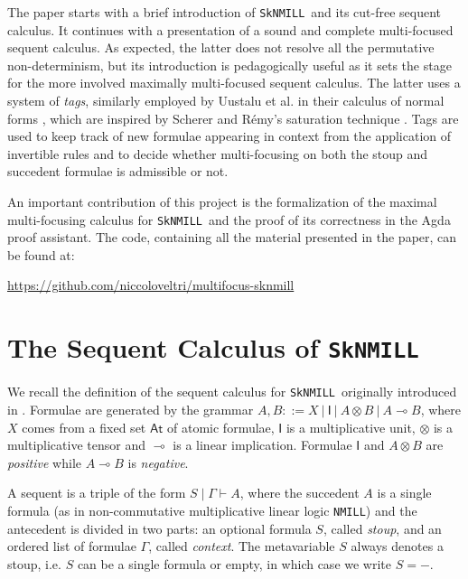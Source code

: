 \documentclass[runningheads]{llncs}
\newcommand{\ot}{\otimes}
\newcommand{\lolli}{\multimap}
\newcommand{\I}{\mathsf{I}}
\newcommand{\NMILL}{\texttt{NMILL}}
\newcommand{\SkNMILL}{\texttt{SkNMILL}}
\newcommand{\At}{\mathsf{At}}
\begin{document}
The paper starts with a brief introduction of \SkNMILL\ and its cut-free sequent calculus. It continues with a presentation of a sound and complete multi-focused sequent calculus. As expected, the latter does not resolve all the permutative non-determinism, but its introduction is pedagogically useful as it sets the stage for the more involved maximally multi-focused sequent calculus. The latter uses a system of \emph{tags}, similarly employed by Uustalu et al. in their calculus of normal forms \cite{UVW:protsn}, which are inspired by Scherer and R{\'e}my's saturation technique \cite{scherer:simple:2015}.
Tags are used to keep track of new formulae appearing in context from the application of invertible rules and to decide whether multi-focusing on both the stoup and succedent formulae is admissible or not.

An important contribution of this project is the formalization of the maximal multi-focusing calculus for \SkNMILL\ and the proof of its correctness in the Agda proof assistant. The code, containing all the material presented in the paper, can be found at:
\begin{center}
  \url{https://github.com/niccoloveltri/multifocus-sknmill}
\end{center}


\section{The Sequent Calculus of \SkNMILL}\label{sec:seqcalc}

We recall the definition of the sequent calculus for \SkNMILL\ originally introduced in \cite{UVW:protsn}.
Formulae are generated by the grammar $A,B ::= X \ | \ \I \ | \ A \ot B \ | \ A \lolli B$, where $X$ comes from a fixed set $\At$ of atomic formulae, $\I$ is a multiplicative unit, $\ot$ is a multiplicative tensor and $\lolli$ is a linear implication. Formulae $\I$ and $A \ot B$ are \emph{positive} while $A \lolli B$ is \emph{negative}. 

A sequent is a triple of the form $S \mid \Gamma \vdash A$, where the succedent $A$ is a single formula (as in non-commutative multiplicative linear logic \NMILL) and the antecedent is divided in two parts: an optional formula $S$, called \emph{stoup}, and an ordered list of formulae $\Gamma$, called \emph{context}. 
The metavariable $S$ always denotes a stoup, i.e. $S$ can be a single formula or empty, in which case we write $S = -$.
\end{document}
